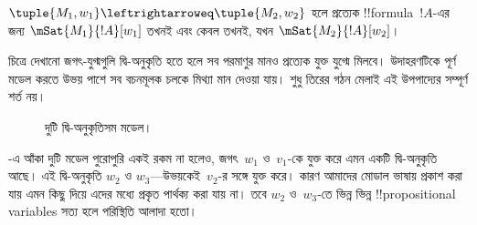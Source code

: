 \documentclass[../../../include/open-logic-section]{subfiles}
\begin{document}
\begin{thm}
$\tuple{M_1, w_1} \leftrightarroweq \tuple{M_2, w_2}$ হলে প্রত্যেক !!{formula}~$!A$-এর জন্য $\mSat{M_1}{!A}[w_1]$ তখনই এবং কেবল তখনই, যখন $\mSat{M_2}{!A}[w_2]$।
\end{thm}
চিত্রে দেখানো জগৎ-যুগ্মগুলি দ্বি-অনুকৃতি হতে হলে সব পরমাণুর মানও প্রত্যেক যুক্ত যুগ্মে মিলবে। উদাহরণটিকে পূর্ণ মডেল করতে উভয় পাশে সব বচনমূলক চলকে মিথ্যা মান দেওয়া যায়। শুধু তিরের গঠন মেলাই এই উপপাদ্যের সম্পূর্ণ শর্ত নয়।

\begin{figure}
  \begin{center}
  \end{center}
  \caption{দুটি দ্বি-অনুকৃতিসম মডেল।}
\end{figure}

-এ আঁকা দুটি মডেল পুরোপুরি একই রকম না হলেও, জগৎ~$w_1$ ও~$v_1$-কে যুক্ত করে এমন একটি দ্বি-অনুকৃতি আছে। এই দ্বি-অনুকৃতি $w_2$ ও $w_3$—উভয়কেই~$v_2$-র সঙ্গে যুক্ত করে। কারণ আমাদের মোডাল ভাষায় প্রকাশ করা যায় এমন কিছু দিয়ে এদের মধ্যে প্রকৃত পার্থক্য করা যায় না। তবে $w_2$ ও~$w_3$-তে ভিন্ন ভিন্ন !!{propositional variable}s সত্য হলে পরিস্থিতি আলাদা হতো।
\end{document}
